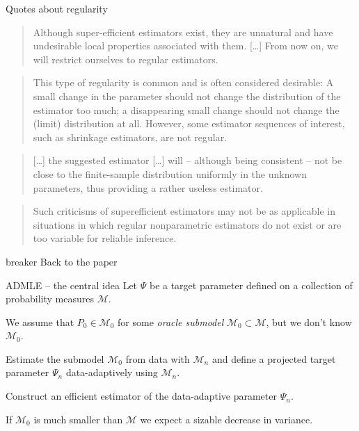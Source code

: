 \documentclass[smaller]{beamer}\usepackage{listings}
\newcommand{\1}{\mathds{1}}
\begin{document}
\begin{frame}[label={sec:orgab9a870}]{Quotes about regularity}
\small

\begin{quote} %
Although super-eﬃcient estimators exist, they are unnatural and have undesirable
local properties associated with them. [\ldots{}] From now on, we will restrict
ourselves to regular estimators. \flushright \cite{tsiatis2007semiparametric}
\end{quote}

\begin{quote} %
This type of regularity is common and is often considered desirable: A small
change in the parameter should not change the distribution of the estimator too
much; a disappearing small change should not change the (limit) distribution at
all. However, some estimator sequences of interest, such as shrinkage
estimators, are not regular. \flushright \cite{van2000asymptotic}
\end{quote}

\begin{quote} %
[\ldots{}] the suggested estimator [\ldots{}] will -- although being consistent -- not be
close to the finite-sample distribution uniformly in the unknown parameters,
thus providing a rather useless estimator. \flushright \cite{leeb2005model}
\end{quote}

\begin{quote} %
Such criticisms of superefficient estimators may not be as applicable in
situations in which regular nonparametric estimators do not exist or are too
variable for reliable inference. \flushright \cite{van2023adaptive}
\end{quote}
\end{frame}

\begin{frame}[label={sec:orgb66bb66}]{\color{white} breaker}
\huge\centering \color{bblue} Back to the paper
\end{frame}

\begin{frame}[label={sec:orgb2ca746}]{ADMLE -- the central idea}
Let \(\Psi\) be a target parameter defined on a collection of probability measures
\(\mathcal{M}\).

\vfill

We assume that \(P_0 \in \mathcal{M}_0\) for some \emph{oracle submodel} \(\mathcal{M}_0 \subset \mathcal{M}\), but we don't know \(\mathcal{M}_0\).

\vfill

Estimate the submodel \(\mathcal{M}_0\) from data with \(\mathcal{M}_n\) and
define a projected target parameter \(\Psi_n\) data-adaptively using \(\mathcal{M}_n\).

\vfill

Construct an efficient estimator of the data-adaptive parameter \(\Psi_n\).

\vfill

If \(\mathcal{M}_0\) is much smaller than \(\mathcal{M}\) we expect a
sizable decrease in variance.
\end{frame}
\end{document}
